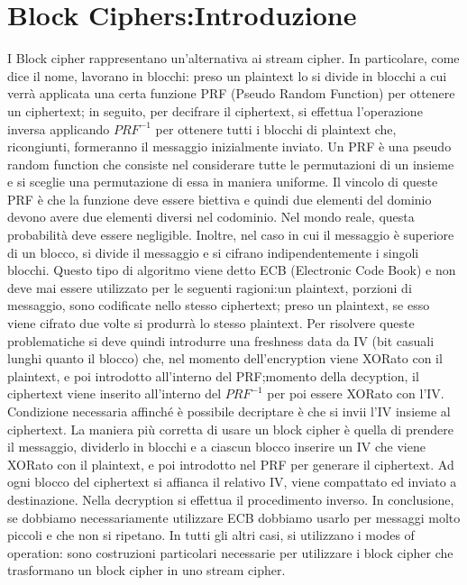 \documentclass{article}
\begin{document}
\section{Block Ciphers:Introduzione}
I Block cipher rappresentano un'alternativa ai stream cipher. In particolare, come dice il nome, lavorano in blocchi: preso un plaintext lo si divide in blocchi a cui verrà applicata una certa funzione PRF (Pseudo Random Function) per ottenere un ciphertext; in seguito, per decifrare il ciphertext, si effettua l'operazione inversa applicando \(PRF^{-1}\) per ottenere tutti i blocchi di plaintext che, ricongiunti, formeranno il messaggio inizialmente inviato\@.
Un PRF è una pseudo random function che consiste nel considerare tutte le permutazioni di un insieme e si sceglie una permutazione di essa in maniera uniforme\@.
Il vincolo di queste PRF è che la funzione deve essere biettiva e quindi due elementi del dominio devono avere due elementi diversi nel codominio. Nel mondo reale, questa probabilità deve essere negligible\@.
Inoltre, nel caso in cui il messaggio è superiore di un blocco, si divide il messaggio e si cifrano indipendentemente i singoli blocchi. Questo tipo di algoritmo viene detto ECB (Electronic Code Book) e non deve mai essere utilizzato per le seguenti ragioni:\@preso un plaintext, porzioni di messaggio, sono codificate nello stesso ciphertext; preso un plaintext, se esso viene cifrato due volte si produrrà lo stesso plaintext\@.
Per risolvere queste problematiche si deve quindi introdurre una freshness data da IV (bit casuali lunghi quanto il blocco) che, nel momento dell'encryption viene XORato con il plaintext, e poi introdotto all'interno del PRF;\@nel momento della decyption, il ciphertext viene inserito all'interno del \(PRF^{-1}\) per poi essere XORato con l'IV\@. Condizione necessaria affinché è possibile decriptare è che si invii l'IV insieme al ciphertext\@.\newline
La maniera più corretta di usare un block cipher è quella di prendere il messaggio, dividerlo in blocchi e a ciascun blocco inserire un IV che viene XORato con il plaintext, e poi introdotto nel PRF per generare il ciphertext. Ad ogni blocco del ciphertext si affianca il relativo IV, viene compattato ed inviato a destinazione\@. Nella decryption si effettua il procedimento inverso\@.\newline
In conclusione, se dobbiamo necessariamente utilizzare ECB dobbiamo usarlo per messaggi molto piccoli e che non si ripetano\@. In tutti gli altri casi, si utilizzano i modes of operation: sono costruzioni particolari necessarie per utilizzare i block cipher che trasformano un block cipher in uno stream cipher.
\end{document}
